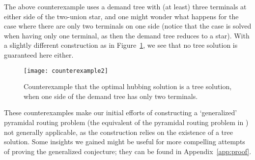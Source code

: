 The above counterexample uses a demand tree with (at least) three terminals at either side of the two-union star, and one might wonder what happens for the case where there are only two terminals on one side (notice that the case is solved when having only one terminal, as then the demand tree reduces to a star).
With a slightly different construction as in Figure~\ref{fig:counterex2}, we see that no tree solution is guaranteed here either. %

\begin{figure}
    \centering
    \texttt{[image: counterexample2]}
    \caption{Counterexample that the optimal hubbing solution is a tree solution, when one side of the demand tree has only two terminals.}
    \label{fig:counterex2}
\end{figure}

These counterexamples make our initial efforts of constructing a `generalized' pyramidal routing problem (the equivalent of the pyramidal routing problem in \cite{grandoni2008short}) not generally applicable, as the construction relies on the existence of a tree solution.
Some insights we gained might be useful for more compelling attempts of proving the generalized conjecture;
they can be found in Appendix~\ref{app:proof}.
